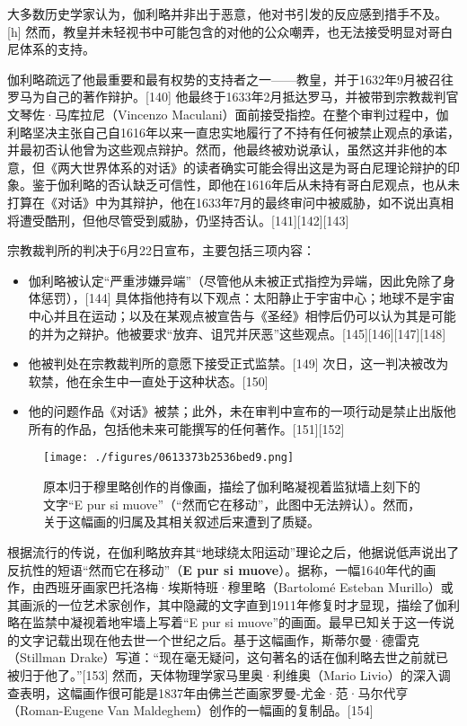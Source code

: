 大多数历史学家认为，伽利略并非出于恶意，他对书引发的反应感到措手不及。[h] 然而，教皇并未轻视书中可能包含的对他的公众嘲弄，也无法接受明显对哥白尼体系的支持。

伽利略疏远了他最重要和最有权势的支持者之一——教皇，并于1632年9月被召往罗马为自己的著作辩护。[140] 他最终于1633年2月抵达罗马，并被带到宗教裁判官文琴佐·马库拉尼（Vincenzo Maculani）面前接受指控。在整个审判过程中，伽利略坚决主张自己自1616年以来一直忠实地履行了不持有任何被禁止观点的承诺，并最初否认他曾为这些观点辩护。然而，他最终被劝说承认，虽然这并非他的本意，但《两大世界体系的对话》的读者确实可能会得出这是为哥白尼理论辩护的印象。鉴于伽利略的否认缺乏可信性，即他在1616年后从未持有哥白尼观点，也从未打算在《对话》中为其辩护，他在1633年7月的最终审问中被威胁，如不说出真相将遭受酷刑，但他尽管受到威胁，仍坚持否认。[141][142][143]  

宗教裁判所的判决于6月22日宣布，主要包括三项内容：  
\begin{itemize}
\item 伽利略被认定“严重涉嫌异端”（尽管他从未被正式指控为异端，因此免除了身体惩罚），[144] 具体指他持有以下观点：太阳静止于宇宙中心；地球不是宇宙中心并且在运动；以及在某观点被宣告与《圣经》相悖后仍可以认为其是可能的并为之辩护。他被要求“放弃、诅咒并厌恶”这些观点。[145][146][147][148]  
\item 他被判处在宗教裁判所的意愿下接受正式监禁。[149] 次日，这一判决被改为软禁，他在余生中一直处于这种状态。[150]  
\item 他的问题作品《对话》被禁；此外，未在审判中宣布的一项行动是禁止出版他所有的作品，包括他未来可能撰写的任何著作。[151][152]
\end{itemize}
\begin{figure}[ht]
\centering
\texttt{[image: ./figures/0613373b2536bed9.png]}
\caption{原本归于穆里略创作的肖像画，描绘了伽利略凝视着监狱墙上刻下的文字“E pur si muove”（“然而它在移动”，此图中无法辨认）。然而，关于这幅画的归属及其相关叙述后来遭到了质疑。} \label{fig_JLL_10}
\end{figure}
根据流行的传说，在伽利略放弃其“地球绕太阳运动”理论之后，他据说低声说出了反抗性的短语“然而它在移动”（\textbf{E pur si muove}）。据称，一幅1640年代的画作，由西班牙画家巴托洛梅·埃斯特班·穆里略（Bartolomé Esteban Murillo）或其画派的一位艺术家创作，其中隐藏的文字直到1911年修复时才显现，描绘了伽利略在监禁中凝视着地牢墙上写着“E pur si muove”的画面。最早已知关于这一传说的文字记载出现在他去世一个世纪之后。基于这幅画作，斯蒂尔曼·德雷克（Stillman Drake）写道：“现在毫无疑问，这句著名的话在伽利略去世之前就已被归于他了。”[153] 然而，天体物理学家马里奥·利维奥（Mario Livio）的深入调查表明，这幅画作很可能是1837年由佛兰芒画家罗曼-尤金·范·马尔代亨（Roman-Eugene Van Maldeghem）创作的一幅画的复制品。[154]  

